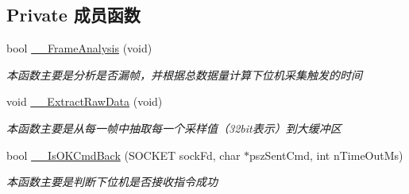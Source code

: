 \subsection*{Private 成员函数}
\begin{DoxyCompactItemize}
\item 
bool \hyperlink{class_c_udp_server_ae0c29c53c86376894a6879fae8e4d6b1}{\+\_\+\+\_\+\+Frame\+Analysis} (void)
\begin{DoxyCompactList}\small\item\em 本函数主要是分析是否漏帧，并根据总数据量计算下位机采集触发的时间 \end{DoxyCompactList}\item 
void \hyperlink{class_c_udp_server_a1cedc8de6419884c89f5731d189175c8}{\+\_\+\+\_\+\+Extract\+Raw\+Data} (void)
\begin{DoxyCompactList}\small\item\em 本函数主要是从每一帧中抽取每一个采样值（32bit表示）到大缓冲区 \end{DoxyCompactList}\item 
bool \hyperlink{class_c_udp_server_af82f718355e3341a4b59dc5ecccb2fc0}{\+\_\+\+\_\+\+Is\+O\+K\+Cmd\+Back} (S\+O\+C\+K\+ET sock\+Fd, char $\ast$psz\+Sent\+Cmd, int n\+Time\+Out\+Ms)
\begin{DoxyCompactList}\small\item\em 本函数主要是判断下位机是否接收指令成功 \end{DoxyCompactList}\end{DoxyCompactItemize}
